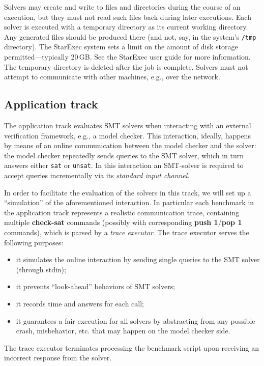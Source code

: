 \documentclass[12pt]{article}
\newcommand{\akey}[1]{\textbf{#1}}
\begin{document}
%
Solvers may create and write to files and directories during the
course of an execution, but they must not read such files back during
later executions.  Each solver is executed with a temporary directory
as its current working directory.  Any generated files should be
produced there (and not, say, in the system's {\tt /tmp} directory).
The StarExec system sets a limit on the amount of disk storage
permitted---typically 20\,GB.  See the StarExec user guide for more
information.  The temporary directory is deleted after the job is
complete.  Solvers must not attempt to communicate with other
machines, e.g., over the network.

\subsection{Application track}

The application track evaluates SMT solvers when interacting with an
external verification framework, e.g., a model checker. This
interaction, ideally, happens by means of an online communication
between the model checker and the solver: the model checker repeatedly
sends queries to the SMT solver, which in turn answers either
\texttt{sat} or \texttt{unsat}.  In this interaction an SMT-solver is
required to accept queries incrementally via its {\em standard input
  channel}.

In order to facilitate the evaluation of the solvers in this track, we
will set up a ``simulation'' of the aforementioned interaction. In
particular each benchmark in the application track represents a
realistic communication trace, containing multiple \akey{check-sat}
commands (possibly with corresponding \akey{push 1}/\akey{pop 1}
commands), which is parsed by a \emph{trace executor}. The trace
executor serves the following purposes:
\begin{itemize}
\item it simulates the online interaction by sending single queries to
  the SMT solver (through stdin);
\item it prevents ``look-ahead'' behaviors of SMT solvers;
\item it records time and answers for each call;
\item it guarantees a fair execution for all solvers by abstracting
  from any possible crash, misbehavior, etc. that may happen on the
  model checker side.
\end{itemize}
%
The trace executor terminates processing the benchmark script upon
receiving an incorrect response from the solver.
\end{document}
